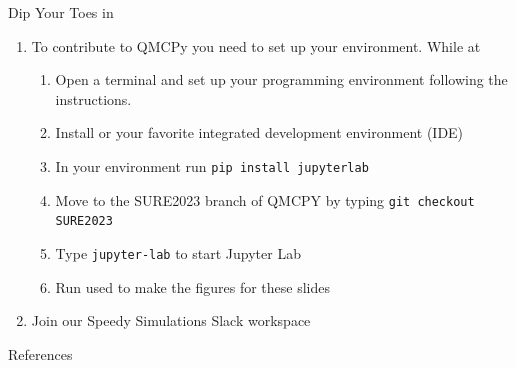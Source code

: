 \documentclass[10pt,compress,xcolor={usenames,dvipsnames},aspectratio=169]{beamer}
\begin{document}
\begin{frame}{Dip Your Toes in}
\begin{enumerate}
    \item To contribute to QMCPy you need to set up your environment.  While at \href{https://github.com/QMCSoftware/QMCSoftware/blob/master/CONTRIBUTING.md}{} 
    \begin{enumerate}[a]
    \item Open a terminal and set up your programming environment following the instructions.
    \item Install \href{https://code.visualstudio.com}{} or your favorite integrated development environment (IDE)
    \item In your environment run  \texttt{\alert{pip install jupyterlab}}
    \item Move to the \alert{SURE2023} branch of QMCPY by typing \texttt{\alert{git checkout SURE2023}}
    \item Type \texttt{\alert{jupyter-lab}} to start Jupyter Lab
    \item Run \href{https://github.com/QMCSoftware/QMCSoftware/blob/SURE2023/demos/talk_paper_demos/SURE_2023_Demos/SURE_2023_Kickoff_Talk_Figures.ipynb}{} used to make the figures for these slides
    \end{enumerate}
    \item Join our \alert{Speedy Simulations} Slack workspace \href{https://join.slack.com/t/speedyreliabl-dvj5497/shared_invite/zt-1vkvdv69x-VItvAXGnFQ3Wmh1MnF82nw}{}
\end{enumerate}
    
\end{frame}


\begin{frame}{References}
	\printbibliography
\end{frame}
\end{document}
